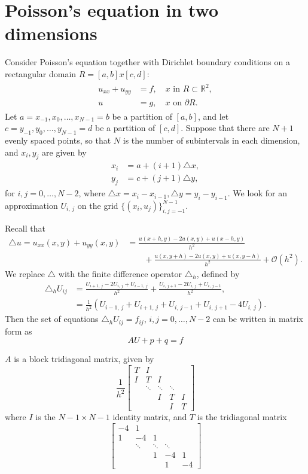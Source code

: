 \section*{Poisson's equation in two dimensions}

 Consider Poisson's equation together with Dirichlet boundary conditions on a rectangular  domain $R = [a,b] x [c,d]$:
 \begin{align}
	\begin{split}
 	u_{xx} + u_{yy} &= f,\quad x \text{ in } R \subset \mathbb{R}^2,\\
 	u &= g, \quad x \text{ on } \partial R.
	\end{split}\label{eqn:2d_poisson}
\end{align}
Let $a = x_{-1}, x_0, \ldots, x_{N-1} = b$ be a partition of $[a,b]$, and let $c = y_{-1}, y_0, \ldots, y_{N-1} = d$ be a partition of $[c,d]$.
Suppose that there are $N+1$ evenly spaced points, so that $N$ is the number of subintervals in each dimension, and $x_i, y_j$ are given by 
\begin{align*}
	x_i &= a + (i+1)\triangle x, \\
	y_j &= c + (j+1)\triangle y,
\end{align*}
for $i,j = 0, \ldots, N-2$, where $\triangle x = x_i-x_{i-1}, \triangle y = y_i-y_{i-1}$.
We look for an approximation $U_{i,\,j}$ on the grid $\{(x_i,u_j)\}_{i,j=-1}^{N-1}$.

Recall that 
 \begin{align*}
 \triangle u = u_{xx}(x,y) + u_{yy}(x,y) &= \frac{u(x+h,y) - 2u(x,y)+ u(x-h,y)}{h^2} \\
 & \qquad{}+ 
 \frac{u(x,y+h) - 2u(x,y)+ u(x,y-h)}{h^2} + \mathcal{O}(h^2).
 \end{align*}
 We replace $\triangle $ with the finite difference operator $\triangle_h$, defined by 
 \begin{align*}
 \triangle_h U_{ij} &= \frac{U_{i+1,\,j} - 2U_{i,\,j} + U_{i-1,\,j}}{h^2} + \frac{U_{i,\,j+1} - 2U_{i,\,j}+ U_{i,\,j-1}}{h^2},\\
&= \frac{1}{h^2}(U_{i-1,\,j} + U_{i+1,\,j} + U_{i,\,j-1} + U_{i,\,j+1}-4U_{i,\,j}).
 \end{align*}
 Then the set of equations  $\triangle_h U_{ij} = f_{ij}$, $i,j = 0,\ldots,N-2$ %
can be written in matrix form as
 \[AU + p +  q  = f\]

$A$ is a block tridiagonal matrix, given by 
\[\frac{1}{h^2}
\begin{bmatrix}
T & I & &  &\\
I &T & I & &\\
&\ddots  & \ddots & \ddots & \\
&  & I & T & I \\
&  &  & I & T\end{bmatrix}\]
where $I$ is the $N-1\times N-1$ %
identity matrix, and $T$ is the tridiagonal matrix
\[\begin{bmatrix}
-4 & 1 & &  &\\
1 &-4 & 1 & &\\
&\ddots  & \ddots & \ddots & \\
&  & 1 & -4 & 1 \\
&  &  & 1 & -4 \end{bmatrix}\]

